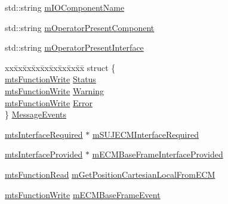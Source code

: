 \begin{DoxyCompactItemize}
\begin{tabbing}
\end{tabbing}\item 
std\-::string \hyperlink{classmts_intuitive_research_kit_console_a74583078f624248b07d77aae203cc81d}{m\-I\-O\-Component\-Name}
\item 
std\-::string \hyperlink{classmts_intuitive_research_kit_console_ae2481e7497eee8411a46868b671e459d}{m\-Operator\-Present\-Component}
\item 
std\-::string \hyperlink{classmts_intuitive_research_kit_console_ab284979d3832f66cb5f304224fcb7771}{m\-Operator\-Present\-Interface}
\item 
\begin{tabbing}
xx\=xx\=xx\=xx\=xx\=xx\=xx\=xx\=xx\=\kill
struct \{\\
\>\hyperlink{classmts_function_write}{mtsFunctionWrite} \hyperlink{classmts_intuitive_research_kit_console_a24760ef6be863714daaf1431214cf328}{Status}\\
\>\hyperlink{classmts_function_write}{mtsFunctionWrite} \hyperlink{classmts_intuitive_research_kit_console_a79190bd57f9e19d6d287323898937c45}{Warning}\\
\>\hyperlink{classmts_function_write}{mtsFunctionWrite} \hyperlink{classmts_intuitive_research_kit_console_afa33bd5aa0138cd3169ac241ef5c3863}{Error}\\
\} \hyperlink{classmts_intuitive_research_kit_console_a869d3c752db96e30fdb394d200c46f9e}{MessageEvents}\\

\end{tabbing}\item 
\hyperlink{classmts_interface_required}{mts\-Interface\-Required} $\ast$ \hyperlink{classmts_intuitive_research_kit_console_a5135a29df0a7ebe047b06a5176f025df}{m\-S\-U\-J\-E\-C\-M\-Interface\-Required}
\item 
\hyperlink{classmts_interface_provided}{mts\-Interface\-Provided} $\ast$ \hyperlink{classmts_intuitive_research_kit_console_a6c0fe26846002ccccae916923b18e6e0}{m\-E\-C\-M\-Base\-Frame\-Interface\-Provided}
\item 
\hyperlink{classmts_function_read}{mts\-Function\-Read} \hyperlink{classmts_intuitive_research_kit_console_a231957e0d25145061c026b6f9ed1fb0d}{m\-Get\-Position\-Cartesian\-Local\-From\-E\-C\-M}
\item 
\hyperlink{classmts_function_write}{mts\-Function\-Write} \hyperlink{classmts_intuitive_research_kit_console_a6527c68ef6983b104bee1de0ed9eaad1}{m\-E\-C\-M\-Base\-Frame\-Event}
\end{DoxyCompactItemize}
